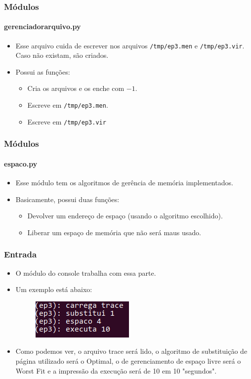 \documentclass{beamer}
\begin{document}
\begin{frame}
	\frametitle{Módulos}
	\framesubtitle{gerenciador\textunderscore arquivo.py}
	\begin{itemize}
		\item Esse arquivo cuida de escrever nos arquivos \texttt{/tmp/ep3.men} e \texttt{/tmp/ep3.vir}. Caso não existam, são criados.
		\item Possui as funções:
		\begin{itemize}
			\item Cria os arquivos e os enche com $-1$.
			\item Escreve em \texttt{/tmp/ep3.men}.
			\item Escreve em \texttt{/tmp/ep3.vir}
		\end{itemize}
	\end{itemize}
\end{frame}

\begin{frame}
	\frametitle{Módulos}
	\framesubtitle{espaco.py}
	\begin{itemize}
		\item Esse módulo tem os algoritmos de gerência de memória implementados.
		\item Basicamente, possui duas funções:
		\begin{itemize}
			\item Devolver um endereço de espaço (usando o algoritmo escolhido).
			\item Liberar um espaço de memória que não será maus usado.
		\end{itemize}
	\end{itemize}
\end{frame}

\begin{frame}
	\frametitle{Entrada}
	\begin{itemize}
		\item O módulo do console trabalha com essa parte.
		\item Um exemplo está abaixo:
		\begin{figure}[!h]
			\centering
			\includegraphics[scale=0.75]{a.png}
		\end{figure}
		\item Como podemos ver, o arquivo trace será lido, o algoritmo de substituição de página utilizado será o Optimal, o de gerenciamento de espaço livre será o Worst Fit e a impressão da execução será de 10 em 10 "segundos".
	\end{itemize}
\end{frame}
\end{document}
